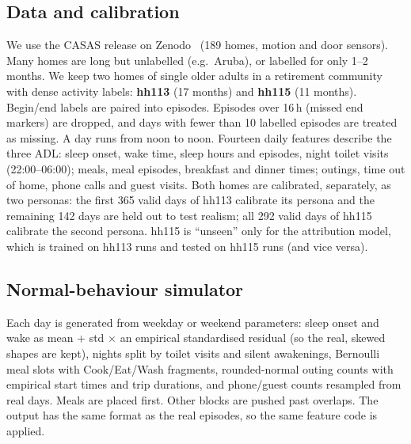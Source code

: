 \documentclass[10pt,a4paper]{article}
\begin{document}
\subsection{Data and calibration}
We use the CASAS release on Zenodo~\cite{casas2025zenodo} (189 homes, motion and door sensors). Many homes are long but
unlabelled (e.g.\ Aruba), or labelled for only 1--2 months. We keep two homes of single older adults in a retirement
community with dense activity labels: \textbf{hh113} (17 months) and \textbf{hh115} (11 months). Begin/end labels are
paired into episodes. Episodes over 16\,h (missed end markers) are dropped, and days with fewer than 10 labelled episodes are
treated as missing. A day runs from noon to noon. Fourteen daily features describe the three ADL: sleep onset, wake time,
sleep hours and episodes, night toilet visits (22:00--06:00); meals, meal episodes, breakfast and dinner times; outings,
time out of home, phone calls and guest visits. Both homes are calibrated, separately, as two personas: the first 365
valid days of hh113 calibrate its persona and the remaining 142 days are held out to test realism; all 292 valid days of
hh115 calibrate the second persona. hh115 is ``unseen'' only for the attribution model, which is trained on hh113 runs
and tested on hh115 runs (and vice versa).

\subsection{Normal-behaviour simulator}
Each day is generated from weekday or weekend parameters: sleep onset and wake as mean + std $\times$ an empirical
standardised residual (so the real, skewed shapes are kept), nights split by toilet visits and silent awakenings,
Bernoulli meal slots with Cook/Eat/Wash fragments, rounded-normal outing counts with empirical start times and trip
durations, and phone/guest counts resampled from real days. Meals are placed first. Other blocks are pushed past
overlaps. The output has the same format as the real episodes, so the same feature code is applied.
\end{document}
